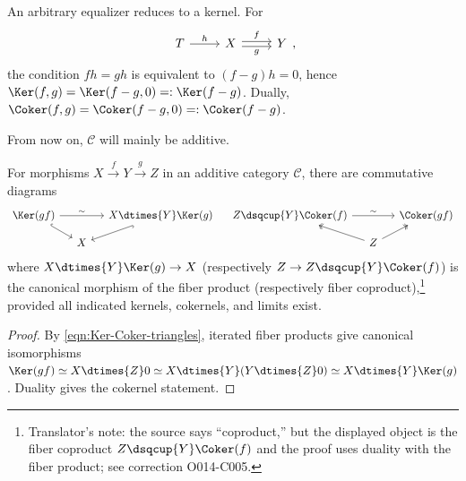 \begin{remark}\label{rem:equalizer-Ker}
	An arbitrary equalizer reduces to a kernel. For
	\[\begin{tikzcd}
	T \arrow[r, "h"] & X \arrow[r, yshift=0.2em, "f"] \arrow[r, yshift=-0.2em, "g"'] & Y
	\end{tikzcd}, \]
	the condition $fh=gh$ is equivalent to $(f-g)h=0$, hence $\Ker(f,g)=\Ker(f-g,0)=:\Ker(f-g)$. Dually, $\Coker(f,g)=\Coker(f-g,0)=:\Coker(f-g)$.
\end{remark}

From now on, $\mathcal C$ will mainly be additive.

\begin{proposition}\label{prop:Ker-Coker-composite}
	For morphisms $X\xrightarrow{f}Y\xrightarrow{g}Z$ in an additive category $\mathcal C$, there are commutative diagrams
	\[\begin{tikzcd}[row sep=small, column sep=small]
		\Ker(gf) \arrow[rr, "\sim"] \arrow[hookrightarrow, rd] & & X \dtimes{Y} \Ker(g) \arrow[hookrightarrow, ld] \\
		& X &
	\end{tikzcd} \quad \begin{tikzcd}[row sep=small, column sep=small]
		Z \dsqcup{Y} \Coker(f) \arrow[rr, "\sim"] & & \Coker(gf) \\
		& Z \arrow[twoheadrightarrow, lu] \arrow[twoheadrightarrow, ru] &
	\end{tikzcd}\]
	where $X\dtimes{Y}\Ker(g)\to X$ (respectively $Z\to Z\dsqcup{Y}\Coker(f)$) is the canonical morphism of the fiber product (respectively fiber coproduct),\footnote{Translator's note: the source says ``coproduct,'' but the displayed object is the fiber coproduct $Z\dsqcup{Y}\Coker(f)$ and the proof uses duality with the fiber product; see correction O014-C005.} provided all indicated kernels, cokernels, and limits exist.
\end{proposition}

\begin{proof}
	By \eqref{eqn:Ker-Coker-triangles}, iterated fiber products give canonical isomorphisms $\Ker(gf)\simeq X\dtimes{Z}0\simeq X\dtimes{Y}(Y\dtimes{Z}0)\simeq X\dtimes{Y}\Ker(g)$. Duality gives the cokernel statement.
\end{proof}

